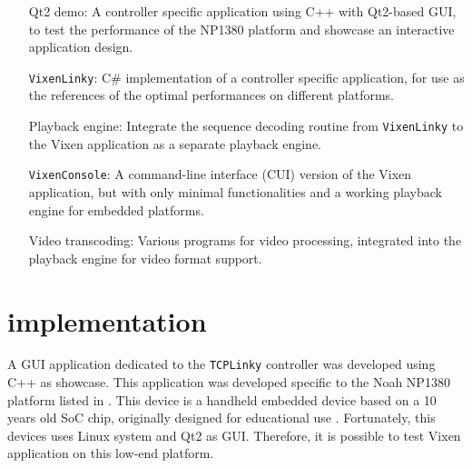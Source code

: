 \renewcommand{\baselinestretch}{\mystretch}
\label{chap:Impl}

 

\begin{enumerate}[noitemsep,leftmargin=4cm]
  \item[Qt2 demo:] A controller specific application using C++ with Qt2-based GUI, to test the performance of the NP1380 platform and showcase an interactive application design.
  \item[\texttt{VixenLinky}:] C\# implementation of a controller specific application, for use as the references of the optimal performances on different platforms.
  \item[Playback engine:] Integrate the sequence decoding routine from \texttt{VixenLinky} to the Vixen application as a separate playback engine.
  \item[\texttt{VixenConsole}:] A command-line interface (CUI) version of the Vixen application, but with only minimal functionalities and a working playback engine for embedded platforms.
  \item[Video transcoding:] Various programs for video processing, integrated into the playback engine for video format support.
\end{enumerate}

\clearpage

\section{ implementation}

A GUI application dedicated to the \texttt{TCPLinky} controller was developed using C++ as  showcase. This application was developed specific to the Noah NP1380 platform listed in . This device is a handheld embedded device based on a 10 years old SoC chip, originally designed for educational use . Fortunately, this devices uses Linux system and Qt2 as GUI. Therefore, it is possible to test Vixen application on this low-end platform.

